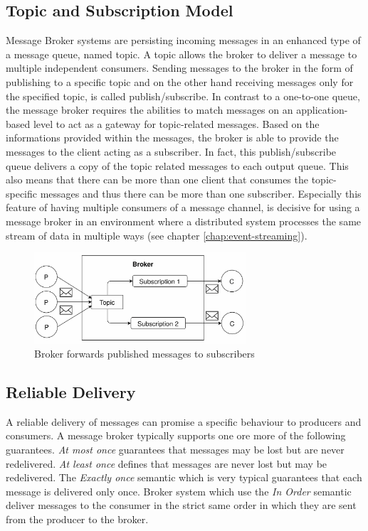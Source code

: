 \subsection{Topic and Subscription Model}
\label{intro-messaging-publishsubscribe}
Message Broker systems are persisting incoming messages in an enhanced type of a
message queue, named topic. A topic allows the broker to deliver a message to
multiple independent consumers. Sending messages to the broker in the form of
publishing to a specific topic and on the other hand receiving messages only for
the specified topic, is called publish/subscribe. In contrast to a one-to-one
queue, the message broker requires the abilities to match messages on an
application-based level to act as a gateway for topic-related messages. Based on
the informations provided within the messages, the broker is able to
provide the messages to the client acting as a subscriber. In fact,
this publish/subscribe queue delivers a copy of the topic related messages to
each output queue. This also means that there can be more than one client that
consumes the topic-specific
messages and thus there can be more than one subscriber. Especially this feature
of having multiple consumers of a message channel, is decisive for using a
message broker in an environment where a distributed system processes the same stream of
data in multiple ways (see chapter \ref{chap:event-streaming}).\cite{EIP03} \cite{TAN06}

\begin{figure}[H]
    \centering
    \includegraphics[width=0.7\textwidth]{images/topic-subscription.png}
    \caption{Broker forwards published messages to subscribers}
    \label{fig:topic-subscription}
\end{figure}

\subsection{Reliable Delivery}
    A reliable delivery of messages can promise a specific behaviour to producers
    and consumers. A message broker typically supports one ore more of the
    following guarantees.
    \textit{At most once} guarantees that messages may be lost but are never
    redelivered. \textit{At least once} defines that messages are never lost
    but may be redelivered. The \textit{Exactly once} semantic which is very
    typical guarantees that each message is delivered only once. Broker system
    which use the \textit{In Order} semantic deliver messages to the consumer in
    the strict same order in which they are sent from the producer to the broker. 

